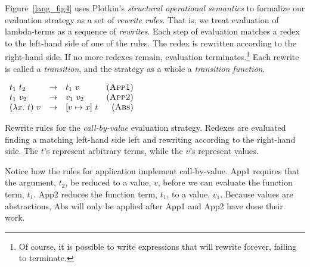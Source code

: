 \documentclass[12pt]{report}
\begin{document}
Figure~\ref{lang_fig4} uses Plotkin's \emph{structural operational
  semantics} \citep{PlotkinXX} to formalize our evaluation strategy as
a set of \emph{rewrite rules}. That is, we treat evaluation of
lambda-terms as a sequence of \emph{rewrites}. Each step of evaluation
matches a redex to the left-hand side of one of the rules. The redex
is rewritten according to the right-hand side. If no more redexes
remain, evaluation terminates.\footnote{Of course, it is possible to
  write expressions that will rewrite forever, failing to terminate.}
Each rewrite is called a \emph{transition}, and the strategy as a
whole a \emph{transition function}.

\begin{myfig}[tbh]
\begin{minipage}{2.5in}
  \begin{math}
    \begin{array}{lclr}
      \lamApp{t_1}{t_2} & \rightarrow & \lamApp{t_1}{v} & (\text{\sc App1}) \\
      \lamApp{t_1}{v_2} & \rightarrow & \lamApp{v_1}{v_2} & (\text{\sc App2}) \\
      \lamAppP{\lamAbs{x}{t}}{v} & \rightarrow & [v \mapsto x]\ t & (\text{\sc Abs})
    \end{array}
  \end{math}
\end{minipage}
  \caption{Rewrite rules for the \emph{call-by-value} evaluation
    strategy. Redexes are evaluated finding a matching left-hand side
    left and rewriting according to the right-hand side. The $t$'s
    represent arbitrary terms, while the $v$'s represent values.}
  \label{lang_fig4}
\end{myfig}

Notice how the rules for application implement call-by-value. {\sc
  App1} requires that the argument, $t_2$, be reduced to a value, $v$,
before we can evaluate the function term, $t_1$. {\sc App2} reduces
the function term, $t_1$, to a value, $v_1$. Because values are
abstractions, {\sc Abs} will only be applied after {\sc App1} and {\sc
  App2} have done their work.

\end{document}
